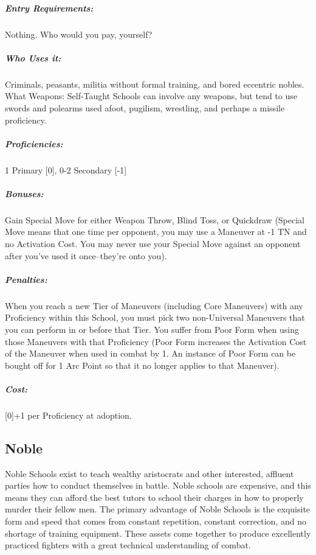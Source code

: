 \documentclass[oneside,11pt,english]{book}
\begin{document}
\vspace{-15pt}\subparagraph{Entry Requirements:} Nothing. Who would you pay, yourself?
\vspace{-15pt}\subparagraph{Who Uses it:} Criminals, peasants, militia without
formal training, and bored eccentric nobles. What Weapons: Self-Taught Schools
can involve any weapons, but tend to use swords and polearms used afoot,
pugilism, wrestling, and perhaps a missile proficiency. 
\vspace{-15pt}\subparagraph{Proficiencies:} 1 Primary [0], 0-2 Secondary [-1]
\vspace{-15pt}\subparagraph{Bonuses:} Gain Special Move for either Weapon Throw,
Blind Toss, or Quickdraw (Special Move means that one time per opponent, you may
use a Maneuver at -1 TN and no Activation Cost. You may never use your Special
Move against an opponent after you’ve used it once--they’re onto you).  
\vspace{-15pt}\subparagraph{Penalties:} When you reach a new Tier of Maneuvers
(including Core Maneuvers) with any Proficiency within this School, you must
pick two non-Universal Maneuvers that you can perform in or before that Tier.
You suffer from Poor Form when using those Maneuvers with that Proficiency (Poor
Form increases the Activation Cost of the Maneuver when used in combat by 1. An
instance of Poor Form can be bought off for 1 Arc Point so that it no longer
applies to that Maneuver). 
\vspace{-15pt}\subparagraph{Cost:} [0]+1 per Proficiency at adoption.

\subsection{Noble}
Noble Schools exist to teach wealthy aristocrats and other interested, affluent parties how to conduct 
themselves in battle. Noble schools are expensive, and this means they can afford the best tutors to school 
their charges in how to properly murder their fellow men. The primary advantage of Noble Schools is the 
exquisite form and speed that comes from constant repetition, constant correction, and no shortage of 
training equipment. These assets come together to produce excellently practiced fighters with a great 
technical understanding of combat. 
\end{document}
